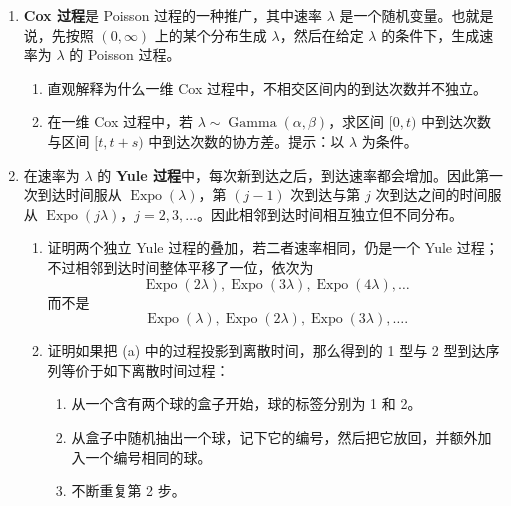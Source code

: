 \documentclass[UTF8, 12pt, fontset=fandol, oneside]{ctexart}
\begin{document}
\begin{enumerate}
\begin{enumerate}
    \item 假设有一个速率函数为 $\lambda(t)$ 的非齐次 Poisson 过程。令
    $N(t)$ 为截至时刻 $t$ 的到达次数，令 $T_j$ 为第 $j$ 次到达时刻。解释为什么 $N(t)$ 与 $T_1,\ldots,T_{N(t)}$ 的混合联合 PDF，即截至时刻 $t$ 观察到的所有数据，为
    \[
      f(n,t_1,\ldots,t_n)
      =
      \frac{e^{-\lambda_{\text{total}}}\lambda_{\text{total}}^n}{n!}
      \cdot n!\cdot
      \frac{\lambda(t_1)\cdots\lambda(t_n)}{\lambda_{\text{total}}^n}
      =
      e^{-\lambda_{\text{total}}}\lambda(t_1)\cdots\lambda(t_n),
    \]
    其中 $0<t_1<t_2<\cdots<t_n$，$n$ 为非负整数，且
    \[
      \lambda_{\text{total}}=\int_0^t\lambda(u)\,du.
    \]
  \end{enumerate}

  \item \textbf{Cox 过程}是 Poisson 过程的一种推广，其中速率 $\lambda$ 是一个随机变量。也就是说，先按照 $(0,\infty)$ 上的某个分布生成 $\lambda$，然后在给定 $\lambda$ 的条件下，生成速率为 $\lambda$ 的 Poisson 过程。
  \begin{enumerate}
    \item 直观解释为什么一维 Cox 过程中，不相交区间内的到达次数并不独立。
    \item 在一维 Cox 过程中，若 $\lambda\sim\operatorname{Gamma}(\alpha,\beta)$，求区间 $[0,t)$ 中到达次数与区间 $[t,t+s)$ 中到达次数的协方差。提示：以 $\lambda$ 为条件。
  \end{enumerate}

  \item 在速率为 $\lambda$ 的 \textbf{Yule 过程}中，每次新到达之后，到达速率都会增加。因此第一次到达时间服从 $\operatorname{Expo}(\lambda)$，第 $(j-1)$ 次到达与第 $j$ 次到达之间的时间服从 $\operatorname{Expo}(j\lambda)$，$j=2,3,\ldots$。因此相邻到达时间相互独立但不同分布。
  \begin{enumerate}
    \item 证明两个独立 Yule 过程的叠加，若二者速率相同，仍是一个 Yule 过程；不过相邻到达时间整体平移了一位，依次为
    \[
      \operatorname{Expo}(2\lambda),\operatorname{Expo}(3\lambda),
      \operatorname{Expo}(4\lambda),\ldots
    \]
    而不是
    \[
      \operatorname{Expo}(\lambda),\operatorname{Expo}(2\lambda),
      \operatorname{Expo}(3\lambda),\ldots.
    \]

    \item 证明如果把 (a) 中的过程投影到离散时间，那么得到的 1 型与 2 型到达序列等价于如下离散时间过程：
    \begin{enumerate}
      \item 从一个含有两个球的盒子开始，球的标签分别为 1 和 2。
      \item 从盒子中随机抽出一个球，记下它的编号，然后把它放回，并额外加入一个编号相同的球。
      \item 不断重复第 2 步。
    \end{enumerate}
  \end{enumerate}


\end{enumerate}
\end{document}
